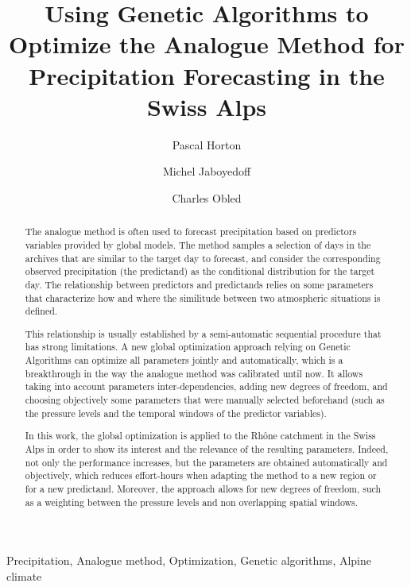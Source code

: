\documentclass[5p]{elsarticle}
\begin{document}
\begin{frontmatter}

\title{Using Genetic Algorithms to Optimize the Analogue Method for Precipitation Forecasting in the Swiss Alps}

\author[unil,terranum]{Pascal Horton}

\author[unil]{Michel Jaboyedoff}
\author[lthe]{Charles Obled}

\address[unil]{University of Lausanne, Lausanne, Switzerland}
\address[terranum]{Terranum, Rue de l'industrie 35 bis, 1030 Bussigny, Switzerland}
\address[lthe]{Universit\'{e} de Grenoble-Alpes, LTHE, Grenoble, France}

\begin{abstract}
The analogue method is often used to forecast precipitation based on predictors variables provided by global models. The method samples a selection of days in the archives that are similar to the target day to forecast, and consider the corresponding observed precipitation (the predictand) as the conditional distribution for the target day. The relationship between predictors and predictands relies on some parameters that characterize how and where the similitude between two atmospheric situations is defined.

This relationship is usually established by a semi-automatic sequential procedure that has strong limitations. A new global optimization approach relying on Genetic Algorithms can optimize all parameters jointly and automatically, which is a breakthrough in the way the analogue method was calibrated until now. It allows taking into account parameters inter-dependencies, adding new degrees of freedom, and choosing objectively some parameters that were manually selected beforehand (such as the pressure levels and the temporal windows of the predictor variables).

In this work, the global optimization is applied to the Rh\^{o}ne catchment in the Swiss Alps in order to show its interest and the relevance of the resulting parameters. Indeed, not only the performance increases, but the parameters are obtained automatically and objectively, which reduces effort-hours when adapting the method to a new region or for a new predictand. Moreover, the approach allows for new degrees of freedom, such as a weighting between the pressure levels and non overlapping spatial windows.
\end{abstract}

\begin{keyword}
Precipitation\sep
Analogue method\sep
Optimization\sep
Genetic algorithms\sep
Alpine climate
\end{keyword}

\end{frontmatter}
\end{document}
